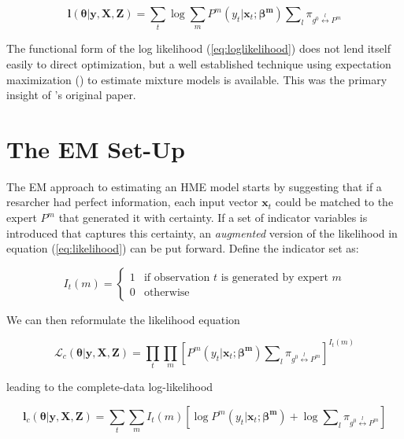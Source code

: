 \documentclass[12pt]{article}
\newcommand{\sumgateprod}[3]{\pi_{#1 \overset{#3}{\longleftrightarrow} #2}}
\newcommand{\shortsum}[1]{\sum \nolimits_{#1}}
\begin{document}
\begin{equation} \label{eq:loglikelihood}
  \boldsymbol{l}(\boldsymbol{\theta}| \boldsymbol{y}, \boldsymbol{X}, \boldsymbol{Z}) = \sum_{t}\log\sum_{m} P^{m}(y_{t}| \boldsymbol{x}_{t}; \boldsymbol{\beta^{m}}) \shortsum{l} \sumgateprod{g^{0}}{P^{m}}{l}
\end{equation}

The functional form of the log likelihood (\ref{eq:loglikelihood}) does not
lend itself easily to direct optimization, but a well established
technique using expectation maximization (\cite{EM_DLR1977}) to estimate mixture
models is available. This was the primary insight of \cite{JordanJacobs1993}'s
original paper.


\section{The EM Set-Up} \label{sec:Estimation}

The EM approach to estimating an HME model starts by suggesting that if a
resarcher had perfect information, each input vector $\boldsymbol{x}_{t}$ could be matched
to the expert $P^{m}$ that generated it with certainty. If a set of indicator
variables is introduced that captures this certainty, an \textit{augmented}
version of the likelihood in equation (\ref{eq:likelihood}) can be put forward.
Define the indicator set as:

\begin{equation} \label{eq:indicator}
  I_{t}(m) = \begin{cases} 
     1 & \textrm{if observation $t$ is generated by expert $m$} \\
     0 & \textrm{otherwise}
             \end{cases}
\end{equation}

We can then reformulate the likelihood equation

\begin{equation}  \label{eq:auglikelihood}
  \mathcal{L}_{c}(\boldsymbol{\theta}| \boldsymbol{y}, \boldsymbol{X}, \boldsymbol{Z}) = \prod_{t} \prod_{m} \left[ P^{m}(y_{t}| \boldsymbol{x}_{t}; \boldsymbol{\beta^{m}}) \shortsum{l} \sumgateprod{g^{0}}{P^{m}}{l} \right]^{I_{t}(m)}
\end{equation}

leading to the complete-data log-likelihood

\begin{equation}  \label{eq:augloglikelihood}
  \boldsymbol{l}_{c}(\boldsymbol{\theta}| \boldsymbol{y}, \boldsymbol{X}, \boldsymbol{Z}) = \sum_{t} \sum_{m} I_{t}(m) \left[\log P^{m}(y_{t}| \boldsymbol{x}_{t}; \boldsymbol{\beta^{m}}) + \log \shortsum{l} \sumgateprod{g^{0}}{P^{m}}{l} \right]
\end{equation}
\end{document}
